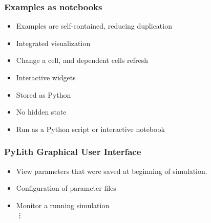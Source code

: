 \documentclass[aspectratio=169]{beamer}
\begin{document}
\begin{frame}
  \frametitle{Examples as notebooks}
  \summary{}

  \begin{itemize}
    \begin{itemize}
      \item Examples are self-contained, reducing duplication
      \item Integrated visualization
      \end{itemize}
    \begin{itemize}
      \item Change a cell, and dependent cells refresh
      \item Interactive widgets
      \item Stored as Python
      \item No hidden state
      \item Run as a Python script or interactive notebook
    \end{itemize}
  \end{itemize}
\end{frame}
 

\begin{frame}
  \frametitle{PyLith Graphical User Interface}
  \summary{}

  \begin{itemize}
    \begin{itemize}
      \item View parameters that were saved at beginning of simulation.
    \end{itemize}
    \begin{itemize}
      \item Configuration of parameter files
      \item Monitor a running simulation \\
      \noindent\vdots
    \end{itemize}
  \end{itemize}

\end{frame}
\end{document}
